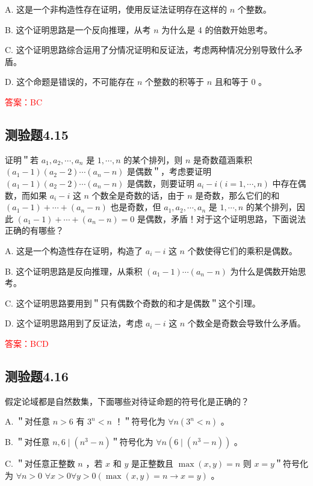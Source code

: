 \documentclass[UTF8, heading=true]{ctexart}
\begin{document}
A. 这是一个非构造性存在证明，使用反证法证明存在这样的 $n$ 个整数。

B. 这个证明思路是一个反向推理，从考 $n$ 为什么是 4 的倍数开始思考。

C. 这个证明思路综合运用了分情况证明和反证法，考虑两种情况分别导致什么矛盾。

D. 这个命题是错误的，不可能存在 $n$ 个整数的积等于 $n$ 且和等于 0 。

\textcolor{red}{答案：BC}

\subsection{测验题4.15}

证明＂若 $a_1, a_2, \cdots, a_n$ 是 $1, \cdots, n$ 的某个排列，则 $n$ 是奇数蕴涵乘积 $\left(a_1-1\right)\left(a_2-2\right) \cdots\left(a_n-n\right)$ 是偶数＂，考虑要证明 $\left(a_1-1\right)\left(a_2-2\right) \cdots\left(a_n-n\right)$ 是偶数，则要证明 $a_i-i(i=1, \cdots, n)$ 中存在偶数，而如果 $a_i-i$ 这 $n$ 个数全是奇数的话，由于 $n$ 是奇数，那么它们的和 $\left(a_1-1\right)+\cdots+\left(a_n-n\right)$ 也是奇数，但 $a_1, a_2, \cdots, a_n$ 是 $1, \cdots, n$ 的某个排列，因此 $\left(a_1-1\right)+\cdots+\left(a_n-n\right)=0$ 是偶数，矛盾！对于这个证明思路，下面说法正确的有哪些？

A. 
这是一个构造性存在证明，构造了 $a_i-i$ 这 $n$ 个数使得它们的乘积是偶数。

B. 这个证明思路是反向推理，从乘积 $\left(a_1-1\right) \cdots\left(a_n-n\right)$ 为什么是偶数开始思考。

C. 
这个证明思路要用到＂只有偶数个奇数的和才是偶数＂这个引理。

D. 
这个证明思路用到了反证法，考虑 $a_i-i$ 这 $n$ 个数全是奇数会导致什么矛盾。

\textcolor{red}{答案：BCD}

\subsection{测验题4.16}

假定论域都是自然数集，下面哪些对待证命题的符号化是正确的？

A. ＂对任意 $n>6$ 有 $3^n<n$ ！＂符号化为 $\forall n\left(3^n<n\right)$ 。

B. ＂对任意 $n, 6 \mid\left(n^3-n\right)$＂符号化为 $\forall n\left(6 \mid\left(n^3-n\right)\right)$ 。

C. ＂对任意正整数 $n$ ，若 $x$ 和 $y$ 是正整数且 $\max (x, y)=n$ 则 $x=y$＂符号化为 $\forall n>0$
$\forall x>0 \forall y>0(\max (x, y)=n \rightarrow x=y)$ 。
\end{document}
